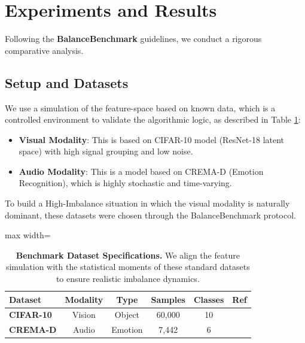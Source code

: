 \documentclass[preprint,a4paper, 10pt, 5p]{elsarticle}
\begin{document}
\section{Experiments and Results}

Following the \textbf{BalanceBenchmark} guidelines, we conduct a rigorous comparative analysis.

\subsection{Setup and Datasets}
We use a simulation of the feature-space based on known data, which is a controlled environment to validate the algorithmic logic, as described in Table \ref{tab:datasets}:
\begin{itemize}
    \item \textbf{Visual Modality}: This is based on CIFAR-10 \cite{krizhevsky2009learning} model (ResNet-18 latent space) with high signal grouping and low noise.
    \item \textbf{Audio Modality}: This is a model based on CREMA-D \cite{cao2014crema} (Emotion Recognition), which is highly stochastic and time-varying.
\end{itemize}
To build a High-Imbalance situation in which the visual modality is naturally dominant, these datasets were chosen through the BalanceBenchmark \cite{xu2025balancebenchmark} protocol.

\begin{table}[h]
\caption{\textbf{Benchmark Dataset Specifications.} We align the feature simulation with the statistical moments of these standard datasets to ensure realistic imbalance dynamics.}
\label{tab:datasets}
\centering
\begin{adjustbox}{max width=\linewidth}\begin{tabular}{@{}lccccc@{}}
\toprule
\textbf{Dataset} & \textbf{Modality} & \textbf{Type} & \textbf{Samples} & \textbf{Classes} & \textbf{Ref} \\ \midrule
\textbf{CIFAR-10} & Vision & Object & 60,000 & 10 & \cite{krizhevsky2009learning} \\
\textbf{CREMA-D} & Audio & Emotion & 7,442 & 6 & \cite{cao2014crema} \\ \bottomrule
\end{tabular}\end{adjustbox}
\end{table}
\end{document}

